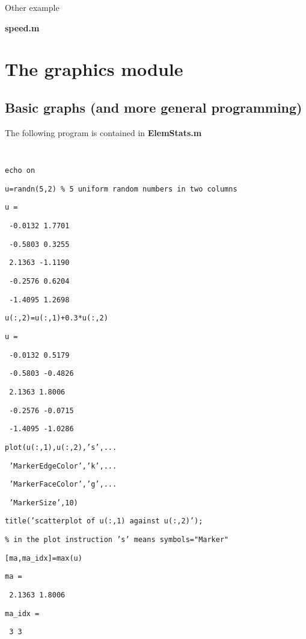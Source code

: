 \documentclass[12pt,a4paper]{article}
\begin{document}
Other example

\textbf{speed.m}

\section{The graphics module}

\subsection{\protect\bigskip Basic graphs (and more general programming)}

The following program is contained in \textbf{ElemStats.m}

\texttt{\TEXTsymbol{>}\TEXTsymbol{>} }

\texttt{echo on}

\texttt{u=randn(5,2) \% 5 uniform random numbers in two columns}

\texttt{u =}

\texttt{\ -0.0132 1.7701}

\texttt{\ -0.5803 0.3255}

\texttt{\ 2.1363 -1.1190}

\texttt{\ -0.2576 0.6204}

\texttt{\ -1.4095 1.2698}

\texttt{u(:,2)=u(:,1)+0.3*u(:,2)}

\texttt{u =}

\texttt{\ -0.0132 0.5179}

\texttt{\ -0.5803 -0.4826}

\texttt{\ 2.1363 1.8006}

\texttt{\ -0.2576 -0.0715}

\texttt{\ -1.4095 -1.0286}

\texttt{plot(u(:,1),u(:,2),'s',...}

\texttt{\ 'MarkerEdgeColor','k',...}

\texttt{\ 'MarkerFaceColor','g',...}

\texttt{\ 'MarkerSize',10)}

\texttt{title('scatterplot of u(:,1) against u(:,2)');}

\texttt{\% in the plot instruction 's' means symbols="Marker"}

\texttt{[ma,ma\_idx]=max(u)}

\texttt{ma =}

\texttt{\ 2.1363 1.8006}

\texttt{ma\_idx =}

\texttt{\ 3 3}
\end{document}
